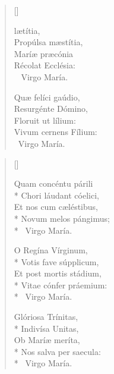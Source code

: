 \newHymn
{}

\begin{multicols}{2}
\begin{verse}[\versewidth]

 lætítia,\\
Propúlsa mæstítia,\\
Maríæ præcónia\\
Récolat Ecclésia:\\
~ \quad Virgo María.

Quæ felíci gaúdio,\\
Resurgénte Dómino,\\
Floruit ut lílium:\\
Vivum cernens Fílium:\\
\ \quad Virgo María.

\end{verse}
\end{multicols}

\pointtrans

\begin{multicols}{2}
\begin{verse}[\versewidth]

Quam concéntu párili\\*
Chori láudant cóelici,\\
Et nos cum cæléstibus,\\*
Novum melos pángimus;\\*
\ \quad Virgo María.

O Regína Vírginum,\\*
Votis fave súpplicum,\\
Et post mortis stádium,\\*
Vitae cónfer práemium:\\*
\ \quad Virgo María.

Glóriosa Trínitas,\\*
Indivísa Unitas,\\
Ob Maríæ meríta,\\*
Nos salva per saecula:\\*
\ \quad Virgo María.

\end{verse}
\end{multicols}


